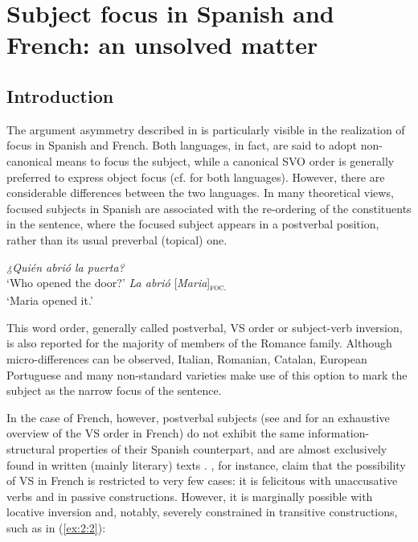
\chapter{Subject focus in Spanish and French: an unsolved matter}\label{sec:2}
\section{Introduction} \label{sub:3.1}

The argument asymmetry described in  is particularly visible in the realization of focus in Spanish and French. Both languages, in fact, are said to adopt non-canonical means to focus the subject, while a canonical SVO order is generally preferred to express object focus (cf. \cite{lambrecht1996information} for both languages). However, there are considerable differences between the two languages. In many theoretical views, focused subjects in Spanish are associated with the re-ordering of the constituents in the sentence, where the focused subject appears in a postverbal position, rather than its usual preverbal (topical) one. 

\ea \label{ex:2:1}
\ea \textit{¿Quién abrió la puerta?}\\
 ‘Who opened the door?'
\ex \textit{La abrió} {[\textit{Maria}]\textsubscript{\textsc{foc.}}}\normalsize\\
`Maria opened it.'
\z \z 

This word order, generally called postverbal, VS order or subject-verb inversion, is also reported for the majority of members of the Romance family. Although micro-differences can be observed, Italian, Romanian, Catalan, European Portuguese and many non-standard varieties make use of this option to mark the subject as the narrow focus of the sentence.

In the case of French, however, postverbal subjects (see \cite{lahousse2006} and \cite{Lahousse2011} for an exhaustive overview of the VS order in French) do not exhibit the same information-structural properties of their Spanish counterpart, and are almost exclusively found in written (mainly literary) texts \parencite{delbecque2006estudio}. \textcite{dufter201614}, for instance, claim that the possibility of VS in French is restricted to very few cases:  it is felicitous with unaccusative verbs and in passive constructions. However, it is marginally possible with locative inversion and, notably, severely constrained in transitive constructions, such as in (\ref{ex:2:2}):

